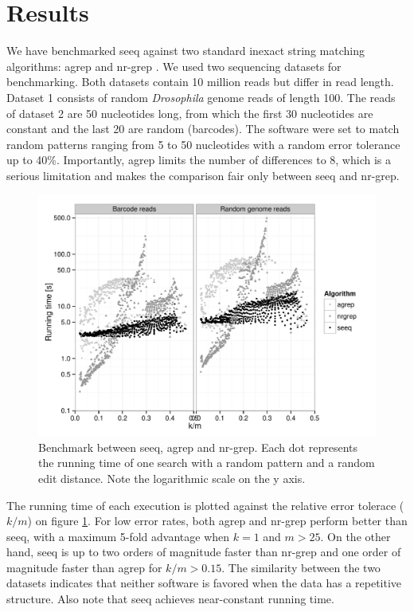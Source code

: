 \documentclass{bioinfo}
\begin{document}
\section{Results}

We have benchmarked seeq against two standard inexact string
matching algorithms: agrep \citep{Wu92} and nr-grep \citep{Nav01}. We
used two sequencing datasets for benchmarking. Both datasets contain
10 million reads but differ in read length. Dataset 1 consists of random
\textit{Drosophila} genome reads of length 100. The reads of dataset 2
are 50 nucleotides long, from which the first 30 nucleotides are constant
and the last 20 are random (barcodes). The software were set to match
random patterns ranging from 5 to 50 nucleotides with a random error
tolerance up to 40\%. Importantly, agrep limits the number of differences
to 8, which is a serious limitation and makes the comparison fair only
between seeq and nr-grep.

\begin{figure}[!tpb]
\centerline{\includegraphics[scale=0.5]{results.pdf}}
\caption{Benchmark between seeq, agrep and nr-grep. Each dot represents
the running time of one search with a random pattern and a random
edit distance. Note the logarithmic scale on the y axis.}
\label{fig:results}
\end{figure}


The running time of each execution is plotted against the relative
error tolerace ($k/m$) on figure \ref{fig:results}. For low error
rates, both agrep and nr-grep perform better than seeq, with a maximum
5-fold advantage when $k=1$ and $m > 25$. On the other hand, seeq is
up to two orders of magnitude faster than nr-grep and one order of
magnitude faster than agrep for $k/m > 0.15$. The similarity between
the two datasets indicates that neither software is favored when the
data has a repetitive structure. Also note that seeq 
achieves near-constant running time.
\end{document}

